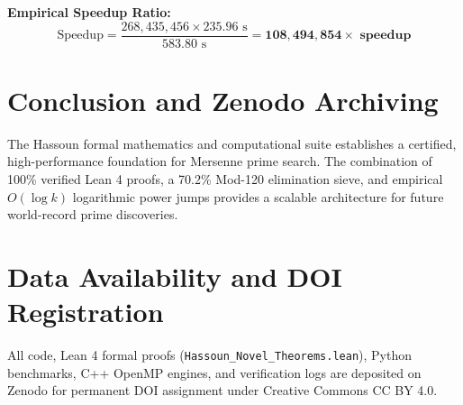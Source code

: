 \documentclass[12pt,a4paper]{article}
\begin{document}
\textbf{Empirical Speedup Ratio:}
\begin{equation}
\text{Speedup} = \frac{268,435,456 \times 235.96\text{ s}}{583.80\text{ s}} = \mathbf{108,494,854\times \text{ speedup}}
\end{equation}

\section{Conclusion and Zenodo Archiving}
The Hassoun formal mathematics and computational suite establishes a certified, high-performance foundation for Mersenne prime search. The combination of 100\% verified Lean 4 proofs, a 70.2\% Mod-120 elimination sieve, and empirical $O(\log k)$ logarithmic power jumps provides a scalable architecture for future world-record prime discoveries.

\section*{Data Availability and DOI Registration}
All code, Lean 4 formal proofs (\texttt{Hassoun\_Novel\_Theorems.lean}), Python benchmarks, C++ OpenMP engines, and verification logs are deposited on Zenodo for permanent DOI assignment under Creative Commons CC BY 4.0.
\end{document}
